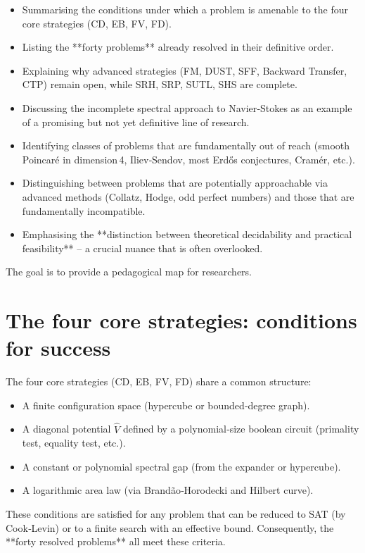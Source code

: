 \documentclass[11pt,a4paper]{article}
\begin{document}
\begin{itemize}
\item Summarising the conditions under which a problem is amenable to the four core strategies (CD, EB, FV, FD).
\item Listing the **forty problems** already resolved in their definitive order.
\item Explaining why advanced strategies (FM, DUST, SFF, Backward Transfer, CTP) remain open, while SRH, SRP, SUTL, SHS are complete.
\item Discussing the incomplete spectral approach to Navier‑Stokes as an example of a promising but not yet definitive line of research.
\item Identifying classes of problems that are fundamentally out of reach (smooth Poincaré in dimension 4, Iliev‑Sendov, most Erdős conjectures, Cramér, etc.).
\item Distinguishing between problems that are potentially approachable via advanced methods (Collatz, Hodge, odd perfect numbers) and those that are fundamentally incompatible.
\item Emphasising the **distinction between theoretical decidability and practical feasibility** – a crucial nuance that is often overlooked.
\end{itemize}

The goal is to provide a pedagogical map for researchers.

\section{The four core strategies: conditions for success}

The four core strategies (CD, EB, FV, FD) share a common structure:

\begin{itemize}
\item A finite configuration space (hypercube or bounded‑degree graph).
\item A diagonal potential \(\hat{V}\) defined by a polynomial‑size boolean circuit (primality test, equality test, etc.).
\item A constant or polynomial spectral gap (from the expander or hypercube).
\item A logarithmic area law (via Brandão‑Horodecki and Hilbert curve).
\end{itemize}

These conditions are satisfied for any problem that can be reduced to SAT (by Cook‑Levin) or to a finite search with an effective bound. Consequently, the **forty resolved problems** all meet these criteria.
\end{document}
